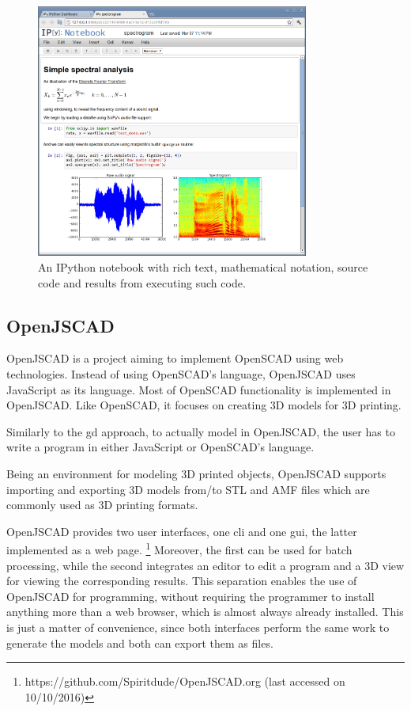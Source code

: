 \begin{figure}
	\centering
	\includegraphics[width=0.8\textwidth]{images/ipython_notebook}
	\caption{An IPython notebook with rich text, mathematical notation, source code and results from executing such code.}
	\label{fig:ipython:notebook}
\end{figure}


\subsection{OpenJSCAD}
OpenJSCAD\cite{openjscad2015site} is a project aiming to implement OpenSCAD\cite{kintel2011openscad} using web technologies.
Instead of using OpenSCAD's language, OpenJSCAD uses JavaScript as its language.
Most of OpenSCAD functionality is implemented in OpenJSCAD.
Like OpenSCAD, it focuses on creating 3D models for 3D printing.

Similarly to the \gls{gd} approach, to actually model in OpenJSCAD, the user has to write a program in either JavaScript or OpenSCAD's language.

Being an environment for modeling 3D printed objects, OpenJSCAD supports importing and exporting 3D models from/to STL and AMF files which are commonly used as 3D printing formats.

OpenJSCAD provides two user interfaces, one \acrfull{cli} and one \acrfull{gui}, the latter implemented as a web page.%
\footnote{https://github.com/Spiritdude/OpenJSCAD.org (last accessed on 10/10/2016)}
Moreover, the first can be used for batch processing, while the second integrates an editor to edit a program and a 3D view for viewing the corresponding results.
This separation enables the use of OpenJSCAD for programming, without requiring the programmer to install anything more than a web browser, which is almost always already installed.
This is just a matter of convenience, since both interfaces perform the same work to generate the models and both can export them as files.

